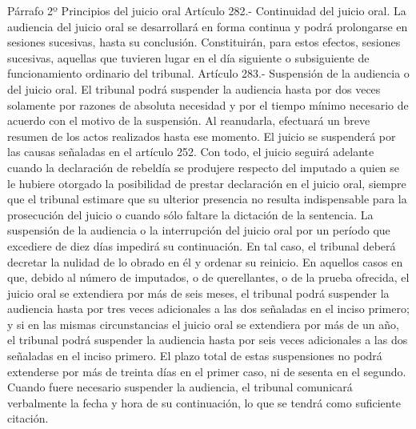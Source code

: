     Párrafo 2º Principios del juicio oral
    Artículo 282.- Continuidad del juicio oral. La audiencia del juicio oral se desarrollará en forma continua y podrá prolongarse en sesiones sucesivas, hasta su conclusión. Constituirán, para estos efectos, sesiones sucesivas, aquellas que tuvieren lugar en el día siguiente o subsiguiente de funcionamiento ordinario del tribunal.
    Artículo 283.- Suspensión de la audiencia o del juicio oral. El tribunal podrá suspender la audiencia hasta por dos veces solamente por razones de absoluta necesidad y por el tiempo mínimo necesario de acuerdo con el motivo de la suspensión. Al reanudarla, efectuará un breve resumen de los actos realizados hasta ese momento.
    El juicio se suspenderá por las causas señaladas en el artículo 252. Con todo, el juicio seguirá adelante cuando la declaración de rebeldía se produjere respecto del imputado a quien se le hubiere otorgado la posibilidad de prestar declaración en el juicio oral, siempre que el tribunal estimare que su ulterior presencia no resulta indispensable para la prosecución del juicio o cuando sólo faltare la dictación de la sentencia.
    La suspensión de la audiencia o la interrupción del juicio oral por un período que excediere de diez días impedirá su continuación. En tal caso, el tribunal deberá decretar la nulidad de lo obrado en él y ordenar su reinicio.
    En aquellos casos en que, debido al número de imputados, o de querellantes, o de la prueba ofrecida, el juicio oral se extendiera por más de seis meses, el tribunal podrá suspender la audiencia hasta por tres veces adicionales a las dos señaladas en el inciso primero; y si en las mismas circunstancias el juicio oral se extendiera por más de un año, el tribunal podrá suspender la audiencia hasta por seis veces adicionales a las dos señaladas en el inciso primero. El plazo total de estas suspensiones no podrá extenderse por más de treinta días en el primer caso, ni de sesenta en el segundo.
    Cuando fuere necesario suspender la audiencia, el tribunal comunicará verbalmente la fecha y hora de su continuación, lo que se tendrá como suficiente citación.

